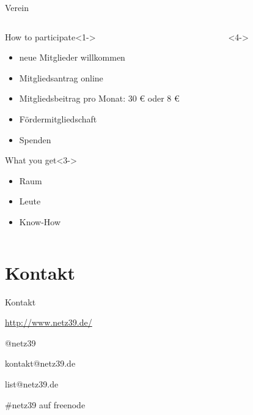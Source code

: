 \documentclass{beamer}
\begin{document}
\begin{frame}[label=secbaellebad]{Verein}
    \begin{columns}[b]
        \begin{column}{0.55\textwidth}
            \begin{block}{How to participate}<1->
                \begin{itemize}
                    \item neue Mitglieder willkommen
                    \item Mitgliedsantrag online
                    \item Mitgliedsbeitrag pro Monat: 30 € oder 8 €
                    \pause
                    \item Fördermitgliedschaft
                    \item Spenden
                \end{itemize}
            \end{block}
            \begin{block}{What you get}<3->
                \begin{itemize}
                    \item Raum
                    \item Leute
                    \item Know-How
                \end{itemize}
            \end{block}
        \end{column}
        \begin{column}{0.45\textwidth}<4->
            \begin{figure}
            \end{figure}
        \end{column}
    \end{columns}            
\end{frame}

\section{Kontakt}

\begin{frame}{Kontakt}
    \begin{center}
        \begin{description}
            \item[WWW] \url{http://www.netz39.de/}
            \item[Twitter/identi.ca] @netz39
            \item[E-Mail] kontakt@netz39.de
            \item[Mailingliste] list@netz39.de
            \item[IRC] \#netz39 auf freenode
        \end{description}
    \end{center}
\end{frame}
\end{document}
